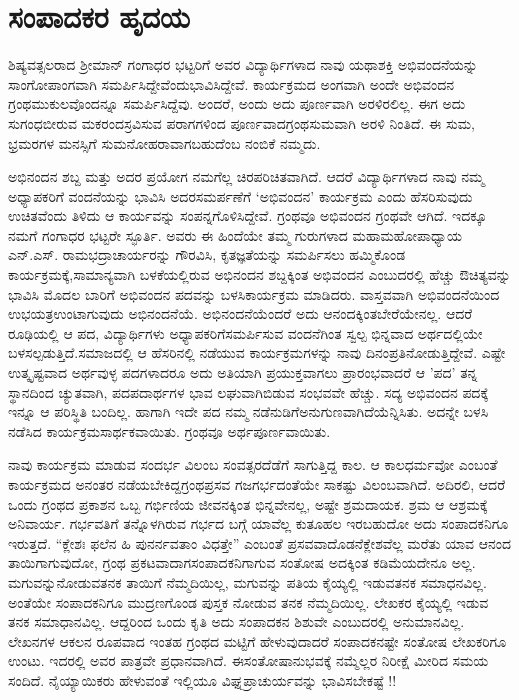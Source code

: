 {\fontsize{14}{16}\selectfont
\chapter{ಸಂಪಾದಕರ ಹೃದಯ}

ಶಿಷ್ಯವತ್ಸಲರಾದ ಶ್ರೀಮಾನ್ ಗಂಗಾಧರ ಭಟ್ಟರಿಗೆ ಅವರ ವಿದ್ಯಾರ್ಥಿಗಳಾದ ನಾವು ಯಥಾಶಕ್ತಿ ಅಭಿವಂದನೆಯನ್ನು ಸಾಂಗೋಪಾಂಗವಾಗಿ ಸಮರ್ಪಿಸಿದ್ದೇವೆಂದು\break  ಭಾವಿಸಿದ್ದೇವೆ. ಕಾರ್ಯಕ್ರಮದ ಅಂಗವಾಗಿ ಅಂದೇ ಅಭಿವಂದನ ಗ್ರಂಥಮುಕುಲ\-ವೊಂದನ್ನೂ ಸಮರ್ಪಿಸಿದ್ದೆವು. ಅಂದರೆ, ಅಂದು ಅದು ಪೂರ್ಣವಾಗಿ ಅರಳಿರಲಿಲ್ಲ. ಈಗ ಅದು ಸುಗಂಧಬೀರುವ ಮಕರಂದಸ್ರವಿಸುವ ಪರಾಗಗಳಿಂದ ಪೂರ್ಣವಾದ\break  ಗ್ರಂಥಸುಮವಾಗಿ ಅರಳಿ ನಿಂತಿದೆ. ಈ ಸುಮ, ಭ್ರಮರಗಳ ಮನಸ್ಸಿಗೆ ಸುಮನೋಹರಾ\-ವಾಗಬಹುದೆಂಬ ನಂಬಿಕೆ ನಮ್ಮದು.

ಅಭಿನಂದನ ಶಬ್ದ ಮತ್ತು ಅದರ ಪ್ರಯೋಗ ನಮಗೆಲ್ಲ ಚಿರಪರಿಚಿತವಾಗಿದೆ. ಆದರೆ ವಿದ್ಯಾರ್ಥಿಗಳಾದ ನಾವು ನಮ್ಮ ಅಧ್ಯಾಪಕರಿಗೆ ವಂದನೆಯನ್ನು ಭಾವಿಸಿ ಅದರ\break ಸಮರ್ಪಣೆಗೆ ‘ಅಭಿವಂದನ’ ಕಾರ್ಯಕ್ರಮ ಎಂದು ಹೆಸರಿಸುವುದು ಉಚಿತವೆಂದು ತಿಳಿದು ಆ ಕಾರ್ಯವನ್ನು ಸಂಪನ್ನಗೊಳಿಸಿದ್ದೇವೆ. ಗ್ರಂಥವೂ ಅಭಿವಂದನ ಗ್ರಂಥವೇ ಆಗಿದೆ. ಇದಕ್ಕೂ ನಮಗೆ ಗಂಗಾಧರ ಭಟ್ಟರೇ ಸ್ಫೂರ್ತಿ. ಅವರು ಈ ಹಿಂದೆಯೇ ತಮ್ಮ ಗುರುಗಳಾದ ಮಹಾಮಹೋಪಾಧ್ಯಾಯ ಎನ್.ಎಸ್. \hbox{ರಾಮಭದ್ರಾಚಾರ್ಯರನ್ನು}  ಗೌರವಿಸಿ, ಕೃತಜ್ಞತೆಯನ್ನು ಸಮರ್ಪಿಸಲು ಹಮ್ಮಿಕೊಂಡ ಕಾರ್ಯಕ್ರಮಕ್ಕೆ,\break  ಸಾಮಾನ್ಯವಾಗಿ ಬಳಕೆಯಲ್ಲಿರುವ ಅಭಿನಂದನ ಶಬ್ದಕ್ಕಿಂತ ಅಭಿವಂದನ \hbox{ಎಂಬುದರಲ್ಲಿ} ಹೆಚ್ಚು ಔಚಿತ್ಯವನ್ನು ಭಾವಿಸಿ ಮೊದಲ ಬಾರಿಗೆ ಅಭಿವಂದನ ಪದವನ್ನು ಬಳಸಿ\break ಕಾರ್ಯಕ್ರಮ ಮಾಡಿದರು. ವಾಸ್ತವವಾಗಿ ಅಭಿವಂದನೆಯಿಂದ ಉಭಯತ್ರ\break  ಉಂಟಾಗುವುದು ಅಭಿನಂದನೆಯೆ. ಅಭಿನಂದನೆಯೆಂದರೆ ಅದು ಆನಂದಕ್ಕಿಂತ\break  ಬೇರೆಯೇನಲ್ಲ. ಆದರೆ ರೂಢಿಯಲ್ಲಿ ಆ ಪದ, ವಿದ್ಯಾರ್ಥಿಗಳು ಅಧ್ಯಾಪಕರಿಗೆ\break ಸಮರ್ಪಿಸುವ ವಂದನೆಗಿಂತ ಸ್ವಲ್ಪ ಭಿನ್ನವಾದ ಅರ್ಥದಲ್ಲಿಯೇ ಬಳಸಲ್ಪಡುತ್ತಿದೆ.\break ಸಮಾಜದಲ್ಲಿ ಆ ಹೆಸರಿನಲ್ಲಿ ನಡೆಯುವ ಕಾರ್ಯಕ್ರಮಗಳನ್ನು ನಾವು ದಿನಂಪ್ರತಿ\break ನೋಡುತ್ತಿದ್ದೇವೆ. ಎಷ್ಟೇ ಉತ್ಕೃಷ್ಟವಾದ ಅರ್ಥವುಳ್ಳ ಪದಗಳಾದರೂ ಅದು \hbox{ಅತಿಯಾಗಿ} ಪ್ರಯುಕ್ತವಾಗಲು ಪ್ರಾರಂಭವಾದರೆ ಆ ’ಪದ’ ತನ್ನ ಸ್ಥಾನದಿಂದ ಚ್ಯುತವಾಗಿ, ಪದ\enginline{-}ಪದಾರ್ಥಗಳ ಭಾವ ಲಘುವಾಗಿಬಿಡುವ ಸಂಭವವೇ ಹೆಚ್ಚು. ಸದ್ಯ ಅಭಿವಂದನ ಪದಕ್ಕೆ ಇನ್ನೂ ಆ ಪರಿಸ್ಥಿತಿ ಬಂದಿಲ್ಲ. ಹಾಗಾಗಿ ಇದೇ ಪದ ನಮ್ಮ ನಡೆನುಡಿಗೆ\break ಅನುಗುಣವಾಗಿದೆಯೆನ್ನಿಸಿತು. ಅದನ್ನೇ ಬಳಸಿ ನಡೆಸಿದ ಕಾರ್ಯಕ್ರಮ\break  ಸಾರ್ಥಕವಾಯಿತು. ಗ್ರಂಥವೂ ಅರ್ಥಪೂರ್ಣವಾಯಿತು.

ನಾವು ಕಾರ್ಯಕ್ರಮ ಮಾಡುವ ಸಂದರ್ಭ ವಿಲಂಬ ಸಂವತ್ಸರದೆಡೆಗೆ \hbox{ಸಾಗುತ್ತಿದ್ದ} ಕಾಲ.  ಆ ಕಾಲಧರ್ಮವೋ ಎಂಬಂತೆ ಕಾರ್ಯಕ್ರಮದ ಅನಂತರ ನಡೆಯಬೇಕಿದ್ದ\break ಗ್ರಂಥಪ್ರಸವ ಗಜಗರ್ಭದಂತೆಯೇ ಸಾಕಷ್ಟು ವಿಲಂಬವಾಗಿದೆ. ಅದಿರಲಿ, ಆದರೆ ಒಂದು ಗ್ರಂಥದ ಪ್ರಕಾಶನ ಒಬ್ಬ ಗರ್ಭಿಣಿಯ ಜೀವನಕ್ಕಿಂತ ಭಿನ್ನವೇನಲ್ಲ, ಅಷ್ಟೇ \hbox{ಶ್ರಮದಾಯಕ}. ಶ್ರಮ ಆ ಆಶ್ರಮಕ್ಕೆ ಅನಿವಾರ್ಯ. ಗರ್ಭವತಿಗೆ ತನ್ನೊಳಗಿರುವ ಗರ್ಭದ ಬಗ್ಗೆ ಯಾವೆಲ್ಲ ಕುತೂಹಲ ಇರಬಹುದೋ ಅದು ಸಂಪಾದಕನಿಗೂ \hbox{ಇರುತ್ತದೆ}. “ಕ್ಲೇಶಃ ಫಲೆನ ಹಿ ಪುನರ್ನವತಾಂ ವಿಧತ್ತೇ” ಎಂಬಂತೆ ಪ್ರಸವವಾದೊಡನೆ\break ಕ್ಲೇಶವೆಲ್ಲ ಮರೆತು ಯಾವ ಆನಂದ ತಾಯಿಗಾಗುವುದೋ, ಗ್ರಂಥ ಪ್ರಕಟವಾದಾಗ\break ಸಂಪಾದಕನಿಗಾಗುವ ಸಂತೋಷ ಅದಕ್ಕಿಂತ ಕಡಿಮೆಯದೇನೂ ಅಲ್ಲ. ಮಗುವನ್ನು\break ನೋಡುವತನಕ ತಾಯಿಗೆ ನೆಮ್ಮದಿಯಿಲ್ಲ, ಮಗುವನ್ನು ಪತಿಯ ಕೈಯ್ಯಲ್ಲಿ \hbox{ಇಡುವತನಕ} ಸಮಾಧನವಿಲ್ಲ.  ಅಂತೆಯೇ ಸಂಪಾದಕನಿಗೂ ಮುದ್ರಣಗೊಂಡ ಪುಸ್ತಕ ನೋಡುವ ತನಕ ನೆಮ್ಮದಿಯಿಲ್ಲ. ಲೇಖಕರ ಕೈಯ್ಯಲ್ಲಿ ಇಡುವ ತನಕ ಸಮಾಧಾನವಿಲ್ಲ. ಆದ್ದರಿಂದ ಒಂದು ಕೃತಿ ಅದು ಸಂಪಾದಕನ ಶಿಶುವೇ ಎಂಬುದರಲ್ಲಿ ಅನುಮಾನವಿಲ್ಲ. \hbox{ಲೇಖನಗಳ} ಆಕಲನ ರೂಪವಾದ ಇಂತಹ ಗ್ರಂಥದ ಮಟ್ಟಿಗೆ ಹೇಳುವುದಾದರೆ ಸಂಪಾದಕನಷ್ಟೇ ಸಂತೋಷ ಲೇಖಕರಿಗೂ ಉಂಟು. ಇದರಲ್ಲಿ ಅವರ ಪಾತ್ರವೇ ಪ್ರಧಾನವಾಗಿದೆ. ಈ\break ಸಂತೋಷಾನುಭವಕ್ಕೆ ನಮ್ಮೆಲ್ಲರ ನಿರೀಕ್ಷೆ ಮೀರಿದ ಸಮಯ ಸಂದಿದೆ. ನೈಯ್ಯಾಯಿಕರು ಹೇಳುವಂತೆ ಇಲ್ಲಿಯೂ ವಿಘ್ನಪ್ರಾಚುರ್ಯವನ್ನು ಭಾವಿಸಬೇಕಷ್ಟೆ !!

}
